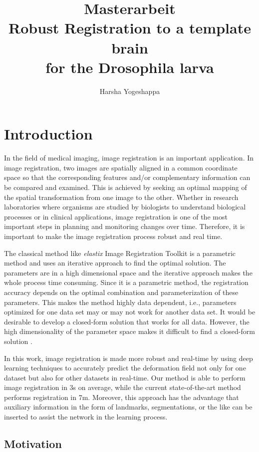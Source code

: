 \documentclass{article}
\title{
	Masterarbeit \\
	Robust Registration to a template brain  \\
	for the Drosophila larva \large }
\author{Harsha Yogeshappa}
\begin{document}
	\maketitle
	\newpage
	
	\tableofcontents
	\newpage
	\section{Introduction}
	In the field of medical imaging, image registration is an important application. In image registration, two images are spatially aligned in a common coordinate space so that the corresponding features and/or complementary information can be compared and examined. This is achieved by seeking an optimal mapping of the spatial transformation from one image to the other. Whether in research laboratories where organisms are studied by biologists to understand biological processes or in clinical applications, image registration is one of the most important steps in planning and monitoring changes over time. Therefore, it is important to make the image registration process robust and real time. 
	
	The classical method like \emph{elastix} Image Registration Toolkit is a parametric method and uses an iterative approach to find the optimal solution. The parameters are in a high dimensional space and the iterative approach makes the whole process time consuming. Since it is a parametric method, the registration accuracy depends on the optimal combination and parameterization of these parameters. This makes the method highly data dependent, i.e., parameters optimized for one data set may or may not work for another data set. It would be desirable to develop a closed-form solution that works for all data. However, the high dimensionality of the parameter space makes it difficult to find a closed-form solution \cite{Fu_2020}.
	
	In this work, image registration is made more robust and real-time by using deep learning techniques to accurately predict the deformation field not only for one dataset but also for other datasets in real-time. Our method is able to perform image registration in 3s on average, while the current state-of-the-art method performs registration in 7m. Moreover, this approach has the advantage that auxiliary information in the form of landmarks, segmentations, or the like can be inserted to assist the network in the learning process.	

	\subsection{Motivation}
\end{document}

